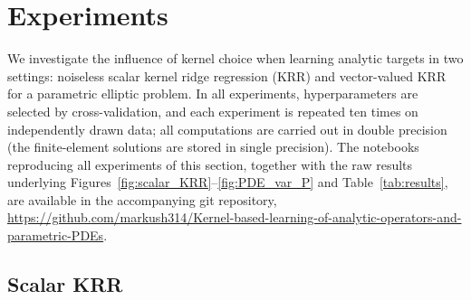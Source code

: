 \documentclass[11pt]{article}
\numberwithin{equation}{section}
\theoremstyle{plain}
\theoremstyle{definition}
\theoremstyle{remark}
\begin{document}
\section{Experiments}\label{sec:experimental_overview}

We investigate the influence of kernel choice when learning analytic targets in two settings: noiseless scalar kernel ridge regression (KRR) and vector-valued KRR for a parametric elliptic problem. In all experiments, hyperparameters are selected by cross-validation, and each experiment is repeated ten times on independently drawn data; all computations are carried out in double precision (the finite-element solutions are stored in single precision). The notebooks reproducing all experiments of this section, together with the raw results underlying Figures~\ref{fig:scalar_KRR}--\ref{fig:PDE_var_P} and Table~\ref{tab:results}, are available in the accompanying git repository, \url{https://github.com/markush314/Kernel-based-learning-of-analytic-operators-and-parametric-PDEs}.

\subsection{Scalar KRR}\label{sec:experimental_overview_scalar}
\end{document}
